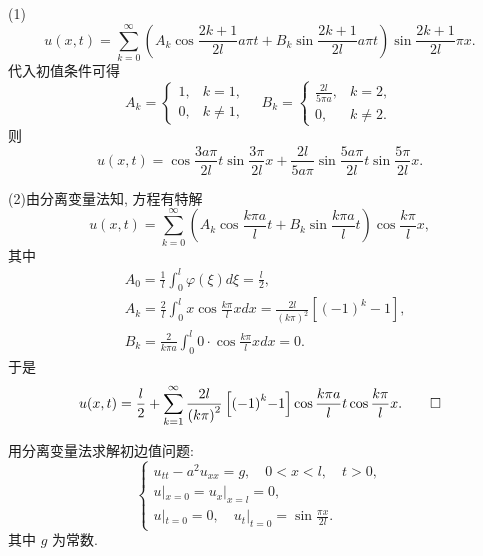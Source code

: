 \begin{solve}
	(1)$$u(x,t)=\sum_{k=0}^{\infty}\left(A_{k}\cos\frac{2k+1}{2l}a\pi t+B_{k}\sin\frac{2k+1}{2l}a\pi t\right)\sin\frac{2k+1}{2l}\pi x.$$
	代入初值条件可得
	$$ A_{k} =\begin{cases}1,&k=1,\\0,&k\neq1,\end{cases}\quad B_k=\begin{cases}\frac{2l}{5\pi a},&k=2,\\0,&k\neq2.\end{cases}$$
	则
	$$u(x,t)=\cos\frac{3a\pi}{2l}t\sin\frac{3\pi}{2l}x+\frac{2l}{5a\pi}\sin\frac{5a\pi}{2l}t\sin\frac{5\pi}{2l}x.$$
	
	(2)由分离变量法知, 方程有特解
	$$u(x,t) = \mathop{{\sum}}_{k = 0}^{\infty}\left(A_{k}\cos\frac{k\pi a}{l}t + B_{k}\sin\frac{k\pi a}{l}t \right)\cos\frac{k\pi}{l}x,$$
	其中
	$$\begin{aligned}
		&A_{0} = \frac{1}{l}{{\int}}_{0}^{l}\varphi(\xi)d\xi = \frac{l}{2},\\
		&A_{k} = \frac{2}{l}{{\int}}_{0}^{l}x\cos\frac{k\pi}{l}xdx = \frac{2l}{{(k\pi)}^{2}}\left\lbrack {({-}1)}^{k} {-} 1 \right\rbrack,\\
		&B_{k} = \frac{2}{k\pi a}{{\int}}_{0}^{l}0 {\cdot} \cos\frac{k\pi}{l}xdx = 0.
	\end{aligned}$$
	于是
	\[u(x,t) = \frac{l}{2} + \mathop{{\sum}}\limits_{k = 1}^{{\infty}}\frac{2l}{{(k\pi)}^{2}}\left\lbrack {({-}1)}^{k} {-} 1 \right\rbrack\cos\frac{k\pi a}{l}t\cos\frac{k\pi}{l}x.\qedhere\]
\end{solve}


\begin{exercise}[4]
  用分离变量法求解初边值问题:
  \[\begin{cases}
    u_{tt} - a^2 u_{xx} = g,\quad 0<x<l,\quad t>0, \\
    u|_{x=0} = u_x|_{x=l} = 0, \\
    u|_{t=0} = 0,\quad u_t|_{t=0} =\sin\frac{\pi x}{2l}.
  \end{cases}\]
  其中 $g$ 为常数.
\end{exercise}

